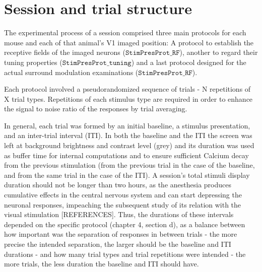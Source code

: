 \section{Session and trial structure}
\label{sec:Session-and-trial-structure}

The experimental process of a session comprised three main protocols for each mouse and each of that animal's V1 imaged position: A protocol to establish the receptive fields of the imaged neurons ($\texttt{StimPresProt\_RF}$), another to regard their tuning properties ($\texttt{StimPresProt\_tuning}$) and a last protocol designed for the actual surround modulation examinations ($\texttt{StimPresProt\_RF}$). 

Each protocol involved a pseudorandomized sequence of trials - N repetitions of X trial types. Repetitions of each stimulus type are required in order to enhance the signal to noise ratio of the responses by trial averaging. 

In general, each trial was formed by an initial baseline, a stimulus presentation, and an inter-trial interval (ITI). In both the baseline and the ITI the screen was left at background brightness and contrast level (grey) and its duration was used as buffer time for internal computations and to ensure sufficient Calcium decay from the previous stimulation (from the previous trial in the case of the baseline, and from the same trial in the case of the ITI). A session's total stimuli display duration should not be longer than two hours, as the anesthesia produces cumulative effects in the central nervous system and can start depressing the neuronal responses, impeaching the subsequent study of its relation with the visual stimulation [REFERENCES]. Thus, the durations of these intervals depended on the specific protocol (chapter 4, section d), as a balance between how important was the separation of responses in between trials - the more precise the intended separation, the larger should be the baseline and ITI durations - and how many trial types and trial repetitions were intended - the more trials, the less duration the baseline and ITI should have.


